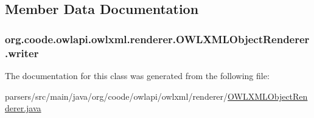 \subsection{Member Data Documentation}
\hypertarget{classorg_1_1coode_1_1owlapi_1_1owlxml_1_1renderer_1_1_o_w_l_x_m_l_object_renderer_ac0209507930e9b0d42b200c6e5121062}{
\subsubsection[{writer}]{ org.\-coode.\-owlapi.\-owlxml.\-renderer.\-O\-W\-L\-X\-M\-L\-Object\-Renderer.\-writer\hspace{0.3cm}{\ttfamily [private]}}}\label{classorg_1_1coode_1_1owlapi_1_1owlxml_1_1renderer_1_1_o_w_l_x_m_l_object_renderer_ac0209507930e9b0d42b200c6e5121062}


The documentation for this class was generated from the following file\-:\begin{DoxyCompactItemize}
\item 
parsers/src/main/java/org/coode/owlapi/owlxml/renderer/\hyperlink{_o_w_l_x_m_l_object_renderer_8java}{O\-W\-L\-X\-M\-L\-Object\-Renderer.\-java}\end{DoxyCompactItemize}
